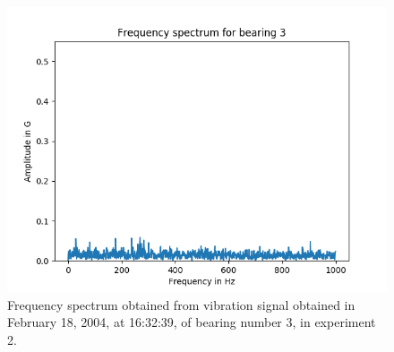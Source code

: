 \documentclass[../Main/thesis.tex]{subfiles}
\begin{document}
\begin{figure}[H] 
   \centering
   \includegraphics[width=4.9in]{../fig/experiment2_bearing3_fft.png} 
   \caption{Frequency spectrum obtained from vibration signal obtained in February 18, 2004, at 16:32:39, of bearing number 3, in experiment 2.}
   \label{fig:bearing3-experiment2-fft}
\end{figure}
\end{document}
